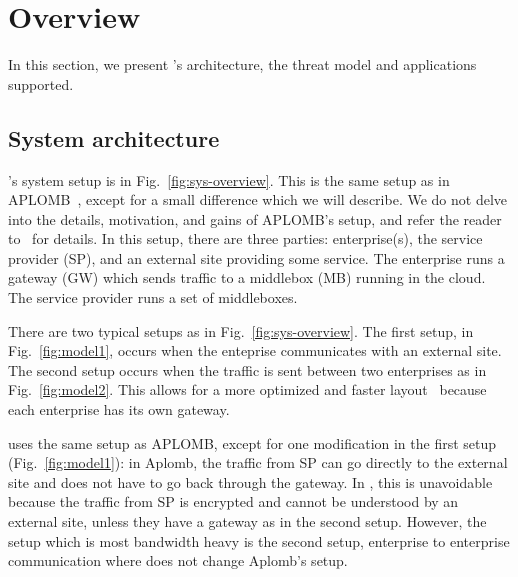 


     
\section{Overview}\label{sec:overview}








In this section, we present \sys's architecture, the threat model and applications supported.


\subsection{System architecture}

\sys's system setup is in Fig.~\ref{fig:sys-overview}. This is the same setup as in APLOMB~\cite{aplomb}, 
except for a small difference which we will describe. 
We do not delve into the details, motivation, and gains of APLOMB's setup, and refer the reader to~\cite{aplomb} for details. 
In this setup, there are three parties: enterprise(s), the service provider (SP), and an external site providing
some service. The enterprise runs a gateway (GW) which sends traffic to a middlebox (MB) running in the cloud.
The service provider runs a set of middleboxes. 

There are two typical setups as in Fig.~\ref{fig:sys-overview}.  The first setup, in Fig.~\ref{fig:model1},  occurs when the enteprise communicates with an external site. The second setup occurs when the traffic is sent between two enterprises as in Fig.~\ref{fig:model2}. This allows for a more optimized and faster layout~\cite{aplomb} because  each enterprise has its own gateway.

\sys uses the same setup as APLOMB, except for one modification in the first setup (Fig.~\ref{fig:model1}): in Aplomb, the traffic from SP can go directly to the external site and does not have to go back through the gateway. In \sys, this is unavoidable because the traffic from SP is encrypted and cannot be understood by an external site, unless they have a gateway as in the second setup. However, the setup which is most bandwidth heavy is the second setup, enterprise to enterprise communication where \sys does not change Aplomb's setup.






